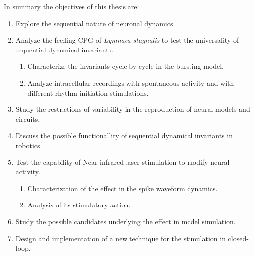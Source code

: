 
In summary the objectives of this thesis are:
\begin{enumerate}
    \item Explore the sequential nature of neuronal dynamics
    \item Analyze the feeding CPG of \textit{Lymnaea stagnalis} to test the universality of sequential dynamical invariants.
    \begin{enumerate}
        \item Characterize the invariants cycle-by-cycle in the bursting model. 
        \item Analyze intracellular recordings with spontaneous activity and with different rhythm initiation stimulations. 
    \end{enumerate}
    \item Study the restrictions of variability in the reproduction of neural models and circuits.
    \item Discuss the possible functionallity of sequential dynamical invariants in robotics. 
    \item Test the capability of Near-infrared laser stimulation to modify neural activity. 
    \begin{enumerate}
        \item Characterization of the effect in the spike waveform dynamics. 
        \item Analysis of its stimulatory action. 
    \end{enumerate}
    \item Study the possible candidates underlying the effect in model simulation. 
    \item Design and implementation of a new technique for the stimulation in closed-loop. 
\end{enumerate}




